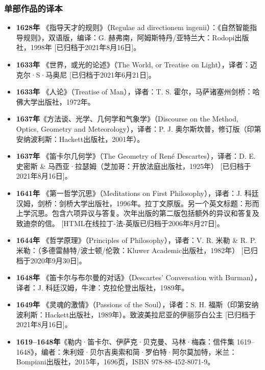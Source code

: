 \subsubsection{单部作品的译本}
\begin{itemize}
\item \textbf{1628年} 《指导天才的规则》（Regulae ad directionem ingenii）：《自然智能指导规则》，双语版，编译：G. 赫弗南，阿姆斯特丹/亚特兰大：Rodopi出版社，1998年 [已归档于2021年8月16日]。
\item \textbf{1633年} 《世界，或光的论述》（The World, or Treatise on Light），译者：迈克尔·S·马奥尼 [已归档于2021年6月21日]。
\item \textbf{1633年} 《人论》（Treatise of Man），译者：T. S. 霍尔，马萨诸塞州剑桥：哈佛大学出版社，1972年。

\item \textbf{1637年}《方法谈、光学、几何学和气象学》（Discourse on the Method, Optics, Geometry and Meteorology），译者：P. J. 奥尔斯坎普，修订版（印第安纳波利斯：Hackett出版社，2001年）。
\item \textbf{1637年} 《笛卡尔几何学》（The Geometry of René Descartes），译者：D. E. 史密斯 & 马西亚·拉瑟姆（芝加哥：开放法庭出版社，1925年） [已归档于2021年8月16日]。
\item \textbf{1641年} 《第一哲学沉思》（Meditations on First Philosophy），译者：J. 科廷汉姆，剑桥：剑桥大学出版社，1996年。拉丁文原版。另一个英文标题：形而上学沉思。包含六项异议与答复。次年出版的第二版包括额外的异议和答复及致迪奈的信。 [HTML在线拉丁-法-英版已归档于2006年8月27日]。
\item \textbf{1644年} 《哲学原理》（Principles of Philosophy），译者：V. R. 米勒 & R. P. 米勒：（多德雷赫特/波士顿/伦敦：Kluwer Academic出版社，1982年） [已归档于2020年9月30日]。
\item \textbf{1648年} 《笛卡尔与布尔曼的对话》（Descartes' Conversation with Burman），译者：J. 科廷汉姆，牛津：克拉伦登出版社，1989年。
\item \textbf{1649年} 《灵魂的激情》（Passions of the Soul），译者：S. H. 福斯（印第安纳波利斯：Hackett出版社，1989年）。致波美拉尼亚的伊丽莎白公主 [已归档于2021年8月16日]。
\item \textbf{1619–1648年}《勒内·笛卡尔、伊萨克·贝克曼、马林·梅森：信件集 1619–1648》，编者：朱利娅·贝尔吉奥索和简·罗伯特·阿尔莫加特，米兰：Bompiani出版社，2015年，1696页，ISBN 978-88-452-8071-9。
\end{itemize}
